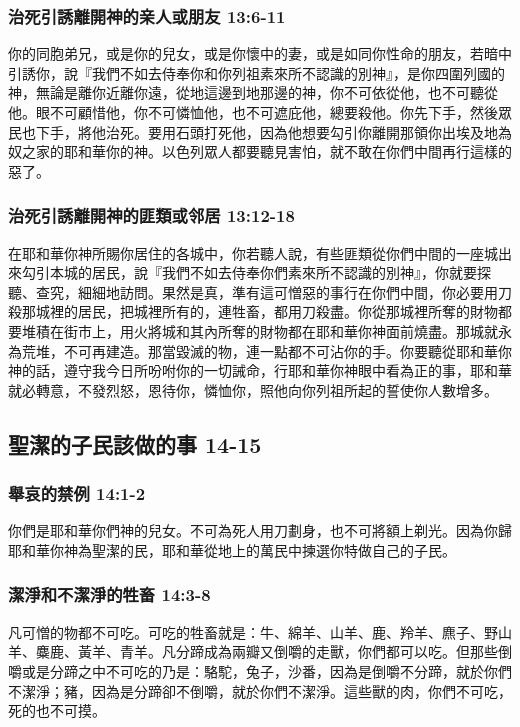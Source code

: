 \subsubsection{治死引誘離開神的亲人或朋友 13:6-11}
你的同胞弟兄，或是你的兒女，或是你懷中的妻，或是如同你性命的朋友，若暗中引誘你，說『我們不如去侍奉你和你列祖素來所不認識的別神』，是你四圍列國的神，無論是離你近離你遠，從地這邊到地那邊的神，你不可依從他，也不可聽從他。眼不可顧惜他，你不可憐恤他，也不可遮庇他，總要殺他。你先下手，然後眾民也下手，將他治死。要用石頭打死他，因為他想要勾引你離開那領你出埃及地為奴之家的耶和華你的神。以色列眾人都要聽見害怕，就不敢在你們中間再行這樣的惡了。

\subsubsection{治死引誘離開神的匪類或邻居 13:12-18}
在耶和華你神所賜你居住的各城中，你若聽人說，有些匪類從你們中間的一座城出來勾引本城的居民，說『我們不如去侍奉你們素來所不認識的別神』，你就要探聽、查究，細細地訪問。果然是真，準有這可憎惡的事行在你們中間，你必要用刀殺那城裡的居民，把城裡所有的，連牲畜，都用刀殺盡。你從那城裡所奪的財物都要堆積在街市上，用火將城和其內所奪的財物都在耶和華你神面前燒盡。那城就永為荒堆，不可再建造。那當毀滅的物，連一點都不可沾你的手。你要聽從耶和華你神的話，遵守我今日所吩咐你的一切誡命，行耶和華你神眼中看為正的事，耶和華就必轉意，不發烈怒，恩待你，憐恤你，照他向你列祖所起的誓使你人數增多。

\subsection{聖潔的子民該做的事 14-15}

\subsubsection{舉哀的禁例 14:1-2 }
你們是耶和華你們神的兒女。不可為死人用刀劃身，也不可將額上剃光。因為你歸耶和華你神為聖潔的民，耶和華從地上的萬民中揀選你特做自己的子民。

\subsubsection{潔淨和不潔淨的牲畜 14:3-8}
凡可憎的物都不可吃。可吃的牲畜就是：牛、綿羊、山羊、鹿、羚羊、麃子、野山羊、麋鹿、黃羊、青羊。凡分蹄成為兩瓣又倒嚼的走獸，你們都可以吃。但那些倒嚼或是分蹄之中不可吃的乃是：駱駝，兔子，沙番，因為是倒嚼不分蹄，就於你們不潔淨；豬，因為是分蹄卻不倒嚼，就於你們不潔淨。這些獸的肉，你們不可吃，死的也不可摸。

